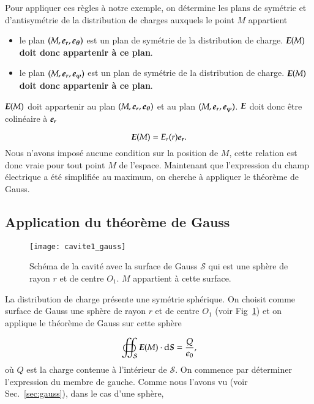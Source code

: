 Pour appliquer ces règles à notre exemple, on détermine les plans de symétrie 
et d'antisymétrie de la distribution de charges auxquels 
le point $M$ appartient

\begin{itemize}
	\item le plan $(M, \er, \etheta)$ est un plan de symétrie de la distribution
		de charge. $\vece(M)$ \textbf{doit donc appartenir à ce plan}.
        \item le plan $(M, \er, \ephi)$ est un plan de symétrie de la distribution de 
		charge. $\vece(M)$ \textbf{doit donc appartenir à ce plan}.
\end{itemize}

$\vece(M)$ doit appartenir au plan $(M, \er, \etheta)$ et au plan $(M, \er, \ephi)$.
$\vece$ doit donc être colinéaire à $\er$

\begin{equation}
	\vece(M) = E_r(r) \er.
\end{equation}
Nous n'avons imposé aucune condition sur la position de $M$, cette relation est
donc vraie pour tout point $M$ de l'espace. Maintenant que l'expression du 
champ électrique a été simplifiée au maximum, on cherche à appliquer le théorème
de Gauss.

\subsection{Application du théorème de Gauss}
\begin{figure}
	\centering
	\texttt{[image: cavite1\_gauss]}
	\caption{Schéma de la cavité avec la surface de Gauss $\mathcal{S}$
	         qui est une sphère de rayon $r$ et de centre $O_1$. $M$
	         appartient à cette surface.}%
	\label{fig:cavite_gauss}
\end{figure}

La distribution de charge présente une symétrie sphérique. On choisit comme surface 
de Gauss une sphère de rayon $r$ et de centre $O_1$ 
(voir Fig~\ref{fig:cavite_gauss}) et on applique le théorème de Gauss sur cette
sphère

\begin{equation}
	\oiint_\mathcal{S} \vece(M) \cdot \ds = \dfrac{Q}{\epsilon_0},
	\label{eq:cavite_gauss}
\end{equation}
où $Q$ est la charge contenue à l'intérieur de $\mathcal{S}$. On commence
par déterminer l'expression du membre de gauche. Comme nous l'avons vu 
(voir Sec.~\ref{sec:gauss}), dans le cas d'une sphère,

